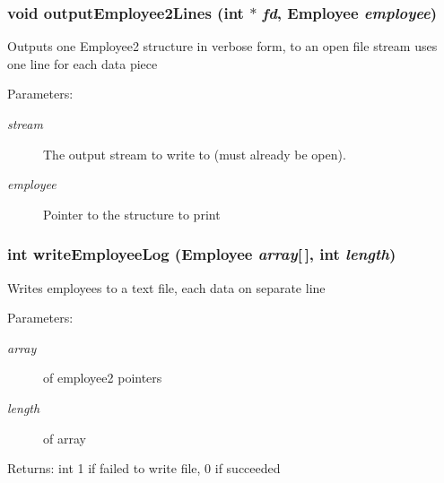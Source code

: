 \subsubsection{\setlength{\rightskip}{0pt plus 5cm}void output\-Employee2Lines (int $\ast$ {\em fd}, \bf{Employee} {\em employee})}\label{part6_8c_249e312ace90679ac0bf7d2a32bb9069}


Outputs one Employee2 structure in verbose form, to an open file stream uses one line for each data piece \begin{Desc}
\item[Parameters:]
\begin{description}
\item[{\em stream}]The output stream to write to (must already be open). \item[{\em employee}]Pointer to the structure to print \end{description}
\end{Desc}
\subsubsection{\setlength{\rightskip}{0pt plus 5cm}int write\-Employee\-Log (\bf{Employee} {\em array}[$\,$], int {\em length})}\label{part6_8c_85c8a4fb48576504799ee5dd64a18d30}


Writes employees to a text file, each data on separate line \begin{Desc}
\item[Parameters:]
\begin{description}
\item[{\em array}]of employee2 pointers \item[{\em length}]of array \end{description}
\end{Desc}
\begin{Desc}
\item[Returns:]int 1 if failed to write file, 0 if succeeded \end{Desc}
